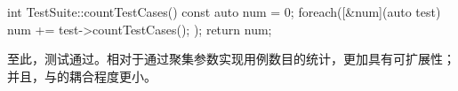 \begin{content}
\begin{leftbar}
 \begin{c++}[caption={\ttfamily{src/mars/core/TestSuite.cc}}]
int TestSuite::countTestCases() const {
  auto num = 0;
  foreach([&num](auto test) {
    num += test->countTestCases();
  });
  return num;
}
 \end{c++}
\end{leftbar}

至此，测试通过。相对于通过聚集参数实现用例数目的统计，更加具有可扩展性；并且，与的耦合程度更小。

\end{content}

